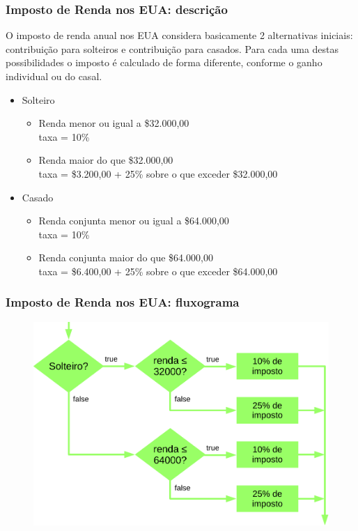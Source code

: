 \documentclass[xcolor={dvipsnames,table},aspectratio=169]{beamer}
\begin{document}
\begin{frame}\frametitle{Imposto de Renda nos EUA: descrição}
O imposto de renda anual nos EUA considera basicamente 2 alternativas iniciais: contribuição para solteiros e contribuição para casados.
Para cada uma destas possibilidades o imposto é calculado de forma diferente, conforme o ganho individual ou do casal.
\begin{itemize}
	\item Solteiro
	\begin{itemize}
		\item Renda menor ou igual a \$32.000,00\\
		taxa = 10\%
		\item Renda maior do que \$32.000,00\\
		taxa = \$3.200,00 + 25\% sobre o que exceder \$32.000,00
	\end{itemize}
	\item Casado
	\begin{itemize}
		\item Renda conjunta menor ou igual a \$64.000,00\\
		taxa = 10\%
		\item Renda conjunta maior do que \$64.000,00\\
		taxa = \$6.400,00 + 25\% sobre o que exceder \$64.000,00
	\end{itemize}
\end{itemize}
\end{frame}

\begin{frame}\frametitle{Imposto de Renda nos EUA: fluxograma}
\begin{center}
\begin{figure}[h]
	\includegraphics[height=0.65\paperheight,center]{pucrs-ep-fprog-unidade_03-decisoes-laminas-fluxograma_imposto_eua.png}
\end{figure}
\end{center}
\end{frame}
\end{document}
